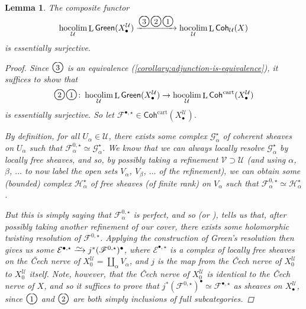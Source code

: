 \documentclass[11pt,fleqn]{article}
\theoremstyle{plain}
\newtheorem{lemma}[theorem]{Lemma}
\theoremstyle{definition}
\theoremstyle{remark}
\numberwithin{equation}{theorem}
\newcommand{\cover}{\mathcal{U}}
\newcommand{\anothercover}{\mathcal{V}}
\newcommand{\anotherbullet}{\star}
\newcommand{\congto}{\xrightarrow{\raisebox{-.5ex}[0ex][0ex]{$\sim$}}}
\newcommand{\gcohUX}{\mathsf{Coh}_{\cover}(X)}
\newcommand{\cartcohX}{\mathsf{Coh}^\mathrm{cart}(X_\bullet^\cover)}
\newcommand{\greenX}{\mathsf{Green}(X_\bullet^\cover)}
\newcommand{\nerve}[1]{X_{#1}^\cover}
\newcommand{\numberincircle}[1]{\text{\Large\textcircled{\small #1}}}
\DeclareMathOperator{\LL}{L}
\DeclareMathOperator{\hocolim}{hocolim}
\begin{document}
        \begin{lemma}\label{lemma:green-gives-essential-surjectivity}
            The composite functor
            \begin{equation*}
                \hocolim_\cover\LL{\greenX}
                \xrightarrow{\numberincircle{3}\numberincircle{2}\numberincircle{1}}
                \hocolim_\cover\LL{\gcohUX}
            \end{equation*}
            is essentially surjective.
            \begin{proof}
                Since $\numberincircle{3}$ is an equivalence (\cref{corollary:adjunction-is-equivalence}), it suffices to show that
                \[
                    \numberincircle{2}\numberincircle{1}\colon
                    \hocolim_\cover\LL{\greenX}
                    \to
                    \hocolim_\cover\LL{\cartcohX}
                \]
                is essentially surjective.
                So let $\mathscr{F}^{\bullet,\anotherbullet}\in\cartcohX$.

                By definition, for all $U_\alpha\in\cover$, there exists some complex $\mathscr{G}_{\alpha}^\anotherbullet$ of coherent sheaves on $U_\alpha$ such that $\mathscr{F}^{0,\anotherbullet}_\alpha \simeq \mathscr{G}_\alpha^\anotherbullet$.
                We know that we can always locally resolve $\mathscr{G}_\alpha^\anotherbullet$ by locally free sheaves, and so, by possibly taking a refinement $\anothercover\supset\cover$ (and using $\alpha$, $\beta$, $\ldots$ to now label the open sets $V_\alpha$, $V_\beta$, $\ldots$ of the refinement), we can obtain some (bounded) complex $\mathscr{H}_\alpha^\anotherbullet$ of free sheaves (of finite rank) on $V_\alpha$ such that $\mathscr{F}_\alpha^{0,\anotherbullet} \simeq \mathscr{H}_\alpha^\anotherbullet$.

                But this is simply saying that $\mathscr{F}_\alpha^{0,\anotherbullet}$ is {perfect}, and so \cite[Proposition~1.2.3]{OBrian&etal1985} (or \cite[Proposition~3.20]{Wei2016}), tells us that, after possibly taking another refinement of our cover, there exists some holomorphic twisting resolution of $\mathscr{F}^{0,\anotherbullet}$.
                Applying the construction of Green's resolution then gives us some $\mathcal{E}^{\bullet,\anotherbullet}\congto j^*(\mathscr{F}^{0,\anotherbullet})^\bullet$, where $\mathcal{E}^{\bullet,\anotherbullet}$ is a complex of locally free sheaves on the Čech nerve of $\nerve{0}=\coprod_\alpha V_\alpha$, and $j$ is the map from the Čech nerve of $\nerve{0}$ to $\nerve{0}$ itself.
                Note, however, that the Čech nerve of $\nerve{0}$ is identical to the Čech nerve of $X$, and so it suffices to prove that $j^*(\mathscr{F}^{0,\anotherbullet})^\bullet\simeq\mathscr{F}^{\bullet,\anotherbullet}$ as sheaves on $\nerve{\bullet}$, since $\numberincircle{1}$ and $\numberincircle{2}$ are both simply inclusions of full subcategories.


\end{proof}
\end{lemma}
\end{document}
